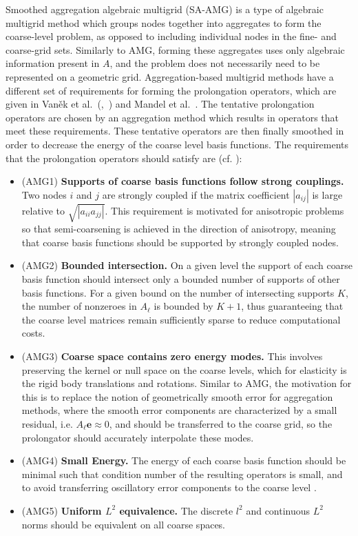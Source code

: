 Smoothed aggregation algebraic multigrid (SA-AMG) is a type of algebraic multigrid method which groups nodes together into aggregates to form the coarse-level problem, as opposed to including individual nodes in the fine- and coarse-grid sets. Similarly to AMG, forming these aggregates uses only algebraic information present in $A$, and the problem does not necessarily need to be represented on a geometric grid. Aggregation-based multigrid methods have a different set of requirements for forming the prolongation operators, which are given in Van\v{e}k et al.~(\cite{Vanek1996},~\cite{Vanek1996_unstruc}) and Mandel et al.~\cite{Mandel1999}. The tentative prolongation operators are chosen by an aggregation method which results in operators that meet these requirements. These tentative operators are then finally smoothed in order to decrease the energy of the coarse level basis functions. The requirements that the prolongation operators should satisfy are (cf. \cite{Vanek1996_unstruc}):

\begin{itemize}
	\item (AMG1) \textbf{Supports of coarse basis functions follow strong couplings.} Two nodes $i$ and $j$ are strongly coupled if the matrix coefficient $|a_{ij}|$ is large relative to $\sqrt{|a_{ii}a_{jj}|}$. This requirement is motivated for anisotropic problems so that semi-coarsening is achieved in the direction of anisotropy, meaning that coarse basis functions should be supported by strongly coupled nodes.
	\item (AMG2) \textbf{Bounded intersection.} On a given level the support of each coarse basis function should intersect only a bounded number of supports of other basis functions. For a given bound on the number of intersecting supports $K$, the number of nonzeroes in $A_\ell$ is bounded by $K+1$, thus guaranteeing that the coarse level matrices remain sufficiently sparse to reduce computational costs.
	\item (AMG3) \textbf{Coarse space contains zero energy modes.} This involves preserving the kernel or null space on the coarse levels, which for elasticity is the rigid body translations and rotations. Similar to AMG, the motivation for this is to replace the notion of geometrically smooth error for aggregation methods, where the smooth error components are characterized by a small residual, i.e. $A_\ell\mathbf{e} \approx 0$, and should be transferred to the coarse grid, so the prolongator should accurately interpolate these modes.
	\item (AMG4) \textbf{Small Energy.} The energy of each coarse basis function should be minimal such that condition number of the resulting operators is small, and to avoid transferring oscillatory error components to the coarse level \cite{Mandel1999}.
	\item (AMG5) \textbf{Uniform $L^2$ equivalence.} The discrete $l^2$ and continuous $L^2$ norms should be equivalent on all coarse spaces.
\end{itemize}

